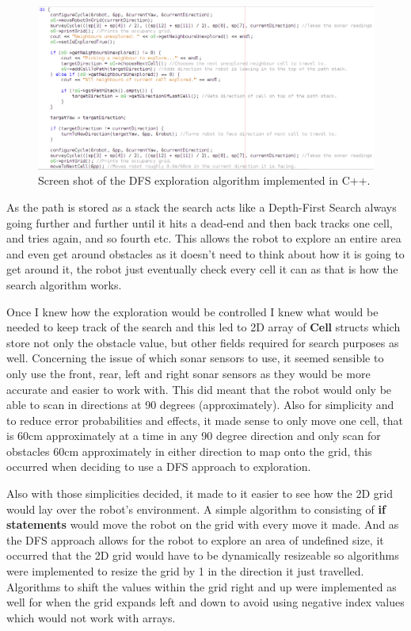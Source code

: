 \documentclass[a4paper,12pt]{article}
\begin{document}
\begin{figure}[H]
\includegraphics[scale=0.53]{robotics3DFS.png}
\caption{Screen shot of the DFS exploration algorithm implemented in C++.}
\end{figure}

\vspace{5mm}
\noindent As the path is stored as a stack the search acts like a Depth-First Search always going further and further until it hits a dead-end and then back tracks one cell, and tries again, and so fourth etc. This allows the robot to explore an entire area and even get around obstacles as it doesn't need to think about how it is going to get around it, the robot just eventually check every cell it can as that is how the search algorithm works.

\vspace{5mm}
\noindent Once I knew how the exploration would be controlled I knew what would be needed to keep track of the search and this led to 2D array of \textbf{Cell} structs which store not only the obstacle value, but other fields required for search purposes as well. Concerning the issue of which sonar sensors to use, it seemed sensible to only use the front, rear, left and right sonar sensors as they would be more accurate and easier to work with. This did meant that the robot would only be able to scan in directions at 90 degrees (approximately). Also for simplicity and to reduce error probabilities and effects, it made sense to only move one cell, that is 60cm approximately at a time in any 90 degree direction and only scan for obstacles 60cm approximately in either direction to map onto the grid, this occurred when deciding to use a DFS approach to exploration.

\vspace{5mm}
\noindent Also with those simplicities decided, it made to it easier to see how the 2D grid would lay over the robot's environment. A simple algorithm to consisting of \textbf{if statements} would move the robot on the grid with every move it made. And as the DFS approach allows for the robot to explore an area of undefined size, it occurred that the 2D grid would have to be dynamically resizeable so algorithms were implemented to resize the grid by 1 in the direction it just travelled. Algorithms to shift the values within the grid right and up were implemented as well for when the grid expands left and down to avoid using negative index values which would not work with arrays.
\end{document}
